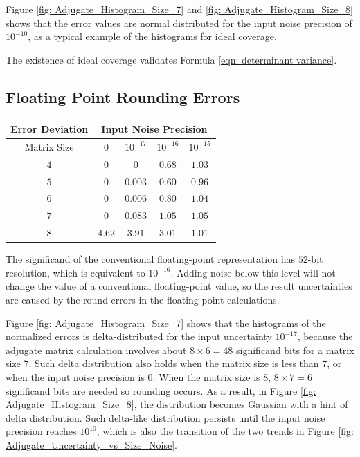 \documentclass[twoside]{article}
\numberwithin{equation}{section}
\begin{document}
Figure \ref{fig: Adjugate_Histogram_Size_7} and \ref{fig: Adjugate_Histogram_Size_8} shows that the error values are normal distributed for the input noise precision of  $10^{-10}$, as a typical example of the histograms for ideal coverage.

The existence of ideal coverage validates Formula \eqref{eqn: determinant variance}.


\subsection{Floating Point Rounding Errors}

\begin{table}
\centering
\begin{tabular}{|c|c|c|c|c|} 
\hline 
Error Deviation & \multicolumn{4}{|c|}{Input Noise Precision}  \\ 
\hline 
Matrix Size & $0$ & $10^{-17}$ & $10^{-16}$ & $10^{-15}$ \\ 
\hline 
$4$ & $0$     &       $0$ & $0.68$ & $1.03$ \\
\hline 
$5$ & $0$     & $0.003$ & $0.60$ & $0.96$ \\
\hline 
$6$ & $0$     & $0.006$ & $0.80$ & $1.04$ \\
\hline 
$7$ & $0$     & $0.083$ & $1.05$ & $1.05$ \\
\hline 
$8$ & $4.62$ & $3.91$  & $3.01$ & $1.01$ \\
\hline 
\end{tabular}
\label{tbl: matrix rounding errors}
\end{table}


The significand of the conventional floating-point representation \cite{Floating_Point_Standard} has $52$-bit resolution, which is equivalent to $10^{-16}$.
Adding noise below this level will not change the value of a conventional floating-point value, so the result uncertainties are caused by the round errors in the floating-point calculations.

Figure \ref{fig: Adjugate_Histogram_Size_7} shows that the histograms of the normalized errors is delta-distributed for the input uncertainty $10^{-17}$, because the adjugate matrix calculation involves about $8 \times 6 = 48$ significand bits for a matrix size $7$.
Such delta distribution also holds when the matrix size is less than $7$, or when the input noise precision is $0$.
When the matrix size is $8$, $8 \times 7 = 6$ significand bits are needed so rounding occurs.
As a result, in Figure \ref{fig: Adjugate_Histogram_Size_8}, the distribution becomes Gaussian with a hint of delta distribution.
Such delta-like distribution persists until the input noise precision reaches $10^{10}$, which is also the transition of the two trends in Figure \ref{fig: Adjugate_Uncertainty_vs_Size_Noise}.
\end{document}
